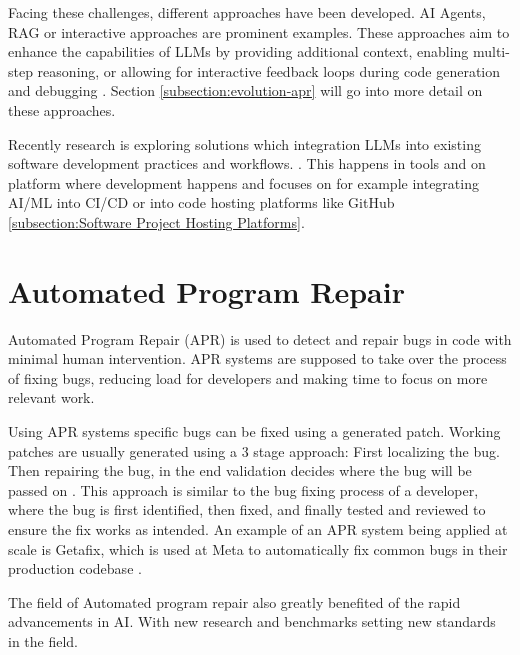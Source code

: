 Facing these challenges, different approaches have been developed. AI Agents, RAG or interactive approaches are prominent examples. These approaches aim to enhance the capabilities of LLMs by providing additional context, enabling multi-step reasoning, or allowing for interactive feedback loops during code generation and debugging \cite{houLargeLanguageModels2024, puvvadiCodingAgentsComprehensive2025}. Section \ref{subsection:evolution-apr} will go into more detail on these approaches.

Recently research is exploring solutions which integration LLMs into existing software development practices and workflows. \cite{puvvadiCodingAgentsComprehensive2025, dohmkeGitHubCopilotMeet2025, IntroducingCodex, sauvolaFutureSoftwareDevelopment2024}. This happens in tools and on platform where development happens and focuses on for example integrating AI/ML into CI/CD \cite{mohammedAIDrivenContinuousIntegration2024} or into code hosting platforms like GitHub \ref{subsection:Software Project Hosting Platforms}.

\section{Automated Program Repair}

Automated Program Repair (APR) is used to detect and repair bugs in code with minimal human intervention. \cite{zhangSurveyLearningbasedAutomated2024} APR systems are supposed to take over the process of fixing bugs, reducing load for developers and making time to focus on more relevant work. \cite{houLargeLanguageModels2024}

Using APR systems specific bugs can be fixed using a generated patch. Working patches are usually generated using a 3 stage approach: First localizing the bug. Then repairing the bug, in the end validation decides where the bug will be passed on \cite{zhangSurveyLearningbasedAutomated2024, baderGetafixLearningFix2019}. This approach is similar to the bug fixing process of a developer, where the bug is first identified, then fixed, and finally tested and reviewed to ensure the fix works as intended. An example of an APR system being applied at scale is Getafix, which is used at Meta to automatically fix common bugs in their production codebase \cite{baderGetafixLearningFix2019}.

The field of Automated program repair also greatly benefited of the rapid advancements in AI. With new research and benchmarks setting new standards in the field.\cite{puvvadiCodingAgentsComprehensive2025,houLargeLanguageModels2024}

